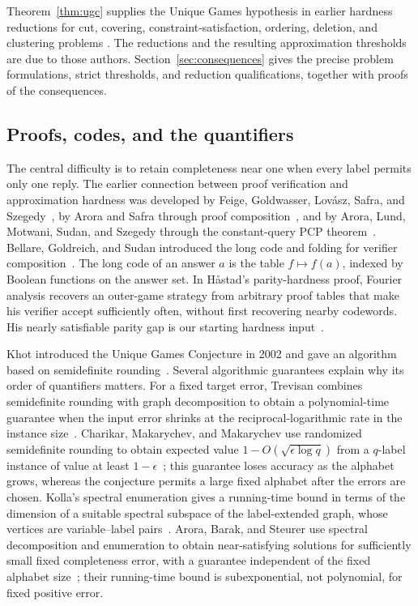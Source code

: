 Theorem~\ref{thm:ugc} supplies the Unique Games hypothesis in earlier
hardness reductions for cut, covering, constraint-satisfaction, ordering,
deletion, and clustering problems
\cite{KKMO07,KhotRegev2008,Raghavendra08,GuruswamiEtAl2011OrderingCSP,CKKRS2006,DemaineEtAl2006Clustering}.
The reductions and the resulting approximation thresholds are due to
those authors. Section~\ref{sec:consequences} gives the precise problem
formulations, strict thresholds, and reduction qualifications, together
with proofs of the consequences.

\subsection{Proofs, codes, and the quantifiers}

The central difficulty is to retain completeness near one when every
label permits only one reply. The earlier connection between proof
verification and approximation hardness was developed by Feige,
Goldwasser, Lov\'asz, Safra, and Szegedy~\cite{FGLSS96}, by Arora and
Safra through proof composition~\cite{AroraSafra98}, and by Arora,
Lund, Motwani, Sudan, and Szegedy through the constant-query PCP
theorem~\cite{ALMSS98}. Bellare, Goldreich, and Sudan introduced the
long code and folding for verifier composition~\cite[Section~3.3]{BGS98}.
The long code of an answer \(a\) is the table \(f\mapsto f(a)\),
indexed by Boolean functions on the answer set. In H\aa stad's
parity-hardness proof, Fourier analysis recovers an outer-game strategy
from arbitrary proof tables that make his verifier accept sufficiently
often, without first recovering nearby codewords. His nearly satisfiable
parity gap is our starting hardness input~\cite{Hastad01}.

Khot introduced the Unique Games Conjecture in 2002 and gave an algorithm
based on semidefinite rounding~\cite{Khot02}.
Several algorithmic guarantees explain why its order of quantifiers
matters. For a fixed target error, Trevisan combines semidefinite rounding
with graph decomposition to obtain a polynomial-time
guarantee when the input error shrinks at the reciprocal-logarithmic
rate in the instance size~\cite{Trevisan08}. Charikar, Makarychev, and
Makarychev use randomized semidefinite rounding to obtain expected value
\(1-O(\sqrt{\epsilon\log q})\) from
a \(q\)-label instance of value at least \(1-\epsilon\)~\cite{CMM06};
this guarantee loses accuracy as the alphabet grows, whereas the
conjecture permits a large fixed alphabet after the errors are chosen.
Kolla's spectral enumeration gives a running-time bound in terms of the
dimension of a suitable spectral subspace of the label-extended graph,
whose vertices are variable--label pairs~\cite{Kolla11}. Arora, Barak, and Steurer use
spectral decomposition and enumeration to obtain near-satisfying
solutions for sufficiently small fixed completeness error, with a
guarantee independent of the fixed alphabet size~\cite{ABS10}; their
running-time bound is subexponential, not polynomial, for fixed positive
error.

